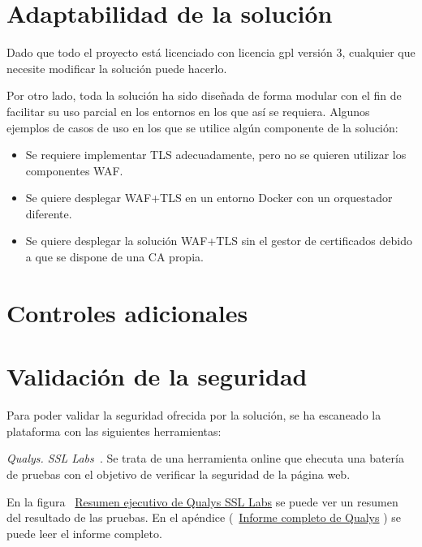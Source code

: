 \section{Adaptabilidad de la solución}
\par Dado que todo el proyecto está licenciado con licencia \acrlong{gpl} versión 3, cualquier que necesite modificar la solución puede hacerlo.
\par Por otro lado, toda la solución ha sido diseñada de forma modular con el fin de facilitar su uso parcial en los entornos en los que así se requiera. Algunos ejemplos de casos de uso en los que se utilice algún componente de la solución: 
\begin{itemize}
\item Se requiere implementar TLS adecuadamente, pero no se quieren utilizar los componentes WAF.
\item Se quiere desplegar WAF+TLS en un entorno Docker con un orquestador diferente.
\item Se quiere desplegar la solución WAF+TLS sin el gestor de certificados debido a que se dispone de una CA propia.
\end{itemize}

\section{Controles adicionales}
\par 

\section{Validación de la seguridad}
Para poder validar la seguridad ofrecida por la solución, se ha escaneado la plataforma con las siguientes herramientas:
\par {\em Qualys. SSL Labs~\cite{ssllabs}}. Se trata de una herramienta online que ehecuta una batería de pruebas con el objetivo de verificar la seguridad de la página web.
\par En la figura ~\hyperref[tabla:resumenqualys]{Resumen ejecutivo de Qualys SSL Labs} se puede ver un resumen del resultado de las pruebas. En el apéndice
(~\hyperref[tabla:informequalys]{Informe completo de Qualys} ) se puede leer el informe completo.

